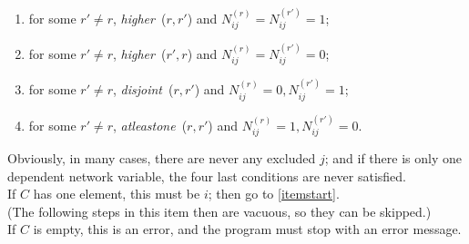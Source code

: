 \documentclass[a4paper,12pt,fleqn]{article}
\newcommand{\nnm}[1]{\textsf{\small\textit{#1}\ }}
\begin{document}
\begin{enumerate}
\begin{enumerate}
      \item for some $r' \neq r$, \nnm{higher}($r, r'$) and $N_{ij}^{(r)} = N_{ij}^{(r')} = 1$;
      \item for some $r' \neq r$, \nnm{higher}($r', r$) and $N_{ij}^{(r)} = N_{ij}^{(r')} = 0$;
      \item for some $r' \neq r$, \nnm{disjoint}($r, r'$) and $N_{ij}^{(r)} = 0, N_{ij}^{(r')} = 1$;
      \item for some $r' \neq r$, \nnm{atleastone}($r, r'$) and $N_{ij}^{(r)} = 1, N_{ij}^{(r')} = 0$.
      \end{enumerate}
      Obviously, in many cases, there are never any excluded $j$; and if there
      is only one dependent network variable, the four last conditions
      are never satisfied.\\
      If $C$ has one element, this must be $i$; then go to \ref{itemstart}.\\
      (The following steps in this item then are vacuous, so they can be skipped.)\\
      If $C$ is empty, this is an error, and the program must stop with an error message.


\end{enumerate}
\end{document}
